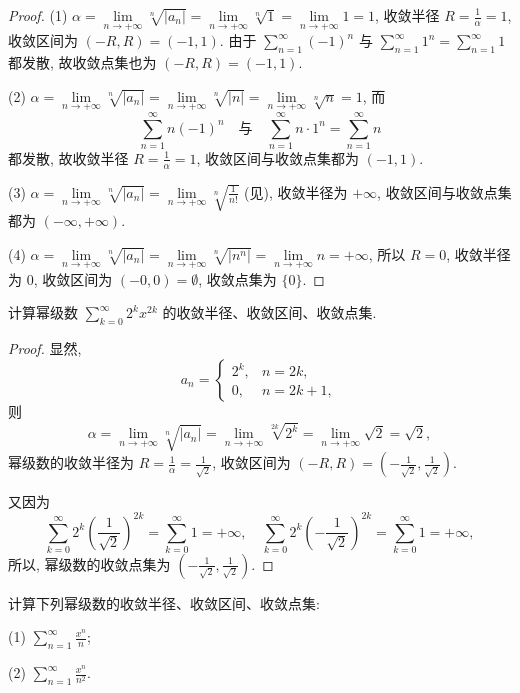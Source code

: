 \begin{proof}
(1) $\alpha=\lim\limits_{n\to+\infty}\sqrt[n]{|a_{n}|}=\lim\limits_{n\to+\infty}\sqrt[n]{1}=\lim\limits_{n\to+\infty}1=1$, 收敛半径 $R=\frac{1}{\alpha}=1$, 收敛区间为 $(-R,R)=(-1,1)$. 由于 $\sum_{n=1}^{\infty}(-1)^{n}$ 与 $\sum_{n=1}^{\infty}1^{n}=\sum_{n=1}^{\infty}1$ 都发散, 故收敛点集也为 $(-R,R)=(-1,1)$.

(2) $\alpha=\lim\limits_{n\to+\infty}\sqrt[n]{|a_{n}|}=\lim\limits_{n\to+\infty}\sqrt[n]{|n|}=\lim\limits_{n\to+\infty}\sqrt[n]{n}=1$, 而
\[
  \sum_{n=1}^{\infty}n(-1)^{n}\quad\text{与}\quad\sum_{n=1}^{\infty}n\cdot1^{n}=\sum_{n=1}^{\infty}n
\]
都发散, 故收敛半径 $R=\frac{1}{\alpha}=1$, 收敛区间与收敛点集都为 $(-1,1)$.

(3) $\alpha=\lim\limits_{n\to+\infty}\sqrt[n]{|a_{n}|}=\lim\limits_{n\to+\infty}\sqrt[n]{\frac{1}{n!}}$ (见), 收敛半径为 $+\infty$, 收敛区间与收敛点集都为 $(-\infty,+\infty)$.

(4) $\alpha=\lim\limits_{n\to+\infty}\sqrt[n]{|a_{n}|}=\lim\limits_{n\to+\infty}\sqrt[n]{|n^{n}|}=\lim\limits_{n\to+\infty}n=+\infty$, 所以 $R=0$, 收敛半径为 $0$, 收敛区间为 $(-0,0)=\emptyset$, 收敛点集为 $\{0\}$.
\end{proof}

\begin{example}\label{ex:14.1.2}
计算幂级数 $\sum_{k=0}^{\infty}2^{k}x^{2k}$ 的收敛半径、收敛区间、收敛点集.
\end{example}

\begin{proof}
显然,
\[
  a_{n}=\begin{cases}
    2^{k}, & n=2k,\\
    0, & n=2k+1,
\end{cases}
\]
则
\[
  \alpha=\lim_{n\to+\infty}\sqrt[n]{|a_{n}|}=\lim_{n\to+\infty}\sqrt[2k]{2^{k}}=\lim_{n\to+\infty}\sqrt{2}=\sqrt{2},
\]
幂级数的收敛半径为 $R=\frac{1}{\alpha}=\frac{1}{\sqrt{2}}$, 收敛区间为 $(-R,R)=\left(-\frac{1}{\sqrt{2}},\frac{1}{\sqrt{2}}\right)$.

又因为
\[
  \sum_{k=0}^{\infty}2^{k}\left(\frac{1}{\sqrt{2}}\right)^{2k}=\sum_{k=0}^{\infty}1=+\infty,\quad\sum_{k=0}^{\infty}2^{k}\left(-\frac{1}{\sqrt{2}}\right)^{2k}=\sum_{k=0}^{\infty}1=+\infty,
\]
所以, 幂级数的收敛点集为 $\left(-\frac{1}{\sqrt{2}},\frac{1}{\sqrt{2}}\right)$.
\end{proof}

\begin{example}\label{ex:14.1.3}
计算下列幂级数的收敛半径、收敛区间、收敛点集:

(1) $\sum_{n=1}^{\infty}\frac{x^{n}}{n}$;

(2) $\sum_{n=1}^{\infty}\frac{x^{n}}{n^{2}}$.
\end{example}

